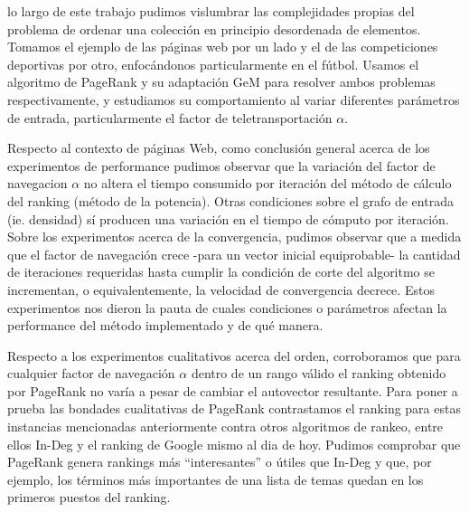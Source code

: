  lo largo de este trabajo pudimos vislumbrar las complejidades propias del problema de ordenar una colección en principio desordenada de elementos. Tomamos el ejemplo de las páginas web por un lado y el de las competiciones deportivas por otro, enfocándonos particularmente en el fútbol. Usamos el algoritmo de PageRank y su adaptación GeM para resolver ambos problemas respectivamente, y estudiamos su comportamiento al variar diferentes parámetros de entrada, particularmente el factor de teletransportación $\alpha$.

Respecto al contexto de páginas Web, como conclusión general acerca de los experimentos de performance pudimos observar que la variación del factor de navegacion $\alpha$ no altera el tiempo consumido por iteración del método de cálculo del ranking (método de la potencia). Otras condiciones sobre el grafo de entrada (ie. densidad) sí producen una variación en el tiempo de cómputo por iteración. \\
Sobre los experimentos acerca de la convergencia, pudimos observar que a medida que el factor de navegación crece -para un vector inicial equiprobable- la cantidad de iteraciones requeridas hasta cumplir la condición de corte del algoritmo se incrementan, o equivalentemente, la velocidad de convergencia decrece. Estos experimentos nos dieron la pauta de cuales condiciones o parámetros afectan la performance del método implementado y de qué manera.

Respecto a los experimentos cualitativos acerca del orden, corroboramos que para cualquier factor de navegación $\alpha$ dentro de un rango válido el ranking obtenido por PageRank no varía a pesar de cambiar el autovector resultante. Para poner a prueba las bondades cualitativas de PageRank contrastamos el ranking para estas instancias mencionadas anteriormente contra otros algoritmos de rankeo, entre ellos In-Deg y el ranking de Google mismo al dia de hoy. Pudimos comprobar que PageRank genera rankings más ``interesantes'' o útiles que In-Deg y que, por ejemplo, los términos más importantes de una lista de temas quedan en los primeros puestos del ranking.

